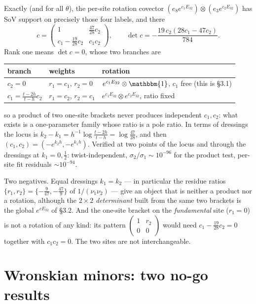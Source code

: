 \documentclass[11pt]{article}
\newcommand{\Ident}{\mathbbm{1}}
\begin{document}
Exactly (and for all $\theta$), the per-site rotation covector
$(e_8e^{c_1E_{32}})\otimes(e_3e^{c_2E_{32}})$ has SoV support on precisely those four labels, and
there
\begin{equation}
c=\begin{pmatrix}1&\frac{47}{28}c_2\\[2pt]c_1-\frac{19}{28}c_2&c_1c_2\end{pmatrix},
\qquad
\det c=-\frac{19\,c_2(28c_1-47c_2)}{784}.
\end{equation}
Rank one means $\det c=0$, whose two branches are
\begin{center}
\begin{tabular}{lll}
\toprule
branch & weights & rotation\\
\midrule
$c_2=0$ & $r_1=c_1$, $r_2=0$ & $e^{c_1E_{32}}\otimes\Ident$, $c_1$ free (this is \S3.1)\\
$c_1=\frac{t-2h}{t-h}c_2$ & $r_1=c_2$, $r_2=c_1$ & $e^{c_1E_{32}}\otimes e^{c_2E_{32}}$, ratio fixed\\
\bottomrule
\end{tabular}
\end{center}
so a product of two one-site brackets never produces independent $c_1,c_2$: what exists is a
one-parameter family whose ratio is a pole ratio. In terms of dressings the locus is
$k_2-k_1=h^{-1}\log\frac{t-2h}{t-h}=\log\frac{47}{28}$, and then $(c_1,c_2)=(-e^{k_2h},-e^{k_1h})$.
Verified at two points of the locus and through the dressings at $k_1=0,\tfrac12$: twist-independent,
$\sigma_2/\sigma_1\sim10^{-96}$ for the product test, per-site fit residuals $\sim10^{-94}$.

Two negatives. Equal dressings $k_1=k_2$ --- in particular the residue ratios
$\{r_1,r_2\}=\{-\frac{9}{47},-\frac{47}{9}\}$ of $1/(\nu_1\nu_2)$ --- give an object that is neither a
product nor a rotation, although the $2\times2$ \emph{determinant} built from the same two brackets
is the global $e^{cE_{32}}$ of \S3.2. And the one-site bracket on the \emph{fundamental} site
($r_1=0$) is not a rotation of any kind: its pattern $\begin{pmatrix}1&r_2\\0&0\end{pmatrix}$ would
need $c_1-\frac{19}{28}c_2=0$ together with $c_1c_2=0$. The two sites are not interchangeable.

\section{Wronskian minors: two no-go results}
\end{document}
